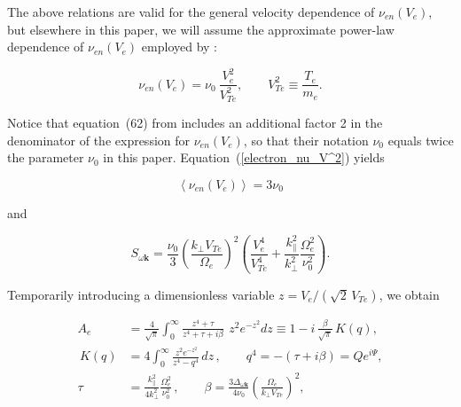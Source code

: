 \documentclass[draft]{agujournal2019}
\renewcommand{\vec}{\mathbf}
\begin{document}
The above relations are valid for the general velocity dependence of $\nu_{en}(V_{e})$, but elsewhere in this 
paper, we will assume the approximate power-law dependence of
$\nu_{en}(V_{e})$ employed by :
\begin{linenomath*}
\begin{equation}
\nu_{en}(V_{e})=\nu_{0}\ \frac{V_{e}^{2}}{V_{Te}^{2}},\qquad V_{Te}^{2}
\equiv\frac{T_{e}}{m_{e}}. 
\label{electron_nu_V^2}
\end{equation}
\end{linenomath*}
Notice that equation~(62) from  includes an additional factor 2 in 
the denominator of the expression for $\nu_{en}(V_{e})$, so that their notation $\nu_{0}$ equals twice the parameter
$\nu_{0}$ in this paper.
%
Equation~(\ref{electron_nu_V^2}) yields
\begin{linenomath*}
\begin{equation}
\left\langle \nu_{en}(V_{e})  \right\rangle =3\nu
_{0}
\label{<nu_en>}
\end{equation}
\end{linenomath*}
and
\begin{linenomath*}
\begin{equation}
S_{\omega\vec{k}}=\frac{\nu_{0}}{3}\left(  \frac{k_{\perp}V_{Te}}%
{\Omega_{e}}\right)  ^{2}\left(\frac{V_{e}^{4}}{V_{Te}^{4}} 
+ \frac{k_{\|}^{2}}{k_{\perp}^{2}}\frac{\Omega_{e}^{2}}{\nu_{0}^{2}}\right)  . 
\label{S_omega,k}
\end{equation}
\end{linenomath*}
Temporarily introducing a dimensionless variable $z=V_e/(\sqrt{2}\,V_{Te})$, we obtain
\begin{linenomath*}
\begin{subequations}\label{A_3,K,tau,beta}
\begin{align}
A_{e}  &  =\frac{4}{\sqrt{\pi}}\int_{0}^{\infty}\frac{z^{4}+\tau}
{z^{4}+\tau+i\beta}\,\ z^{2}e^{-z^{2}}dz\equiv1-i\,\frac{\beta}{\sqrt{\pi}
}\,K(q),
\label{A3}\\
\,K(q)  &  =4\int_{0}^{\infty}\frac{\,z^{2}e^{-z^{2}}}{z^{4}-q^{4}
}\,dz\,,\qquad q^{4}=-(\tau+i\beta)  =Qe^{i\Psi},
\label{Qpsi}\\
\tau &  =\frac{k_{\|}^{2}}{4k_{\perp}^{2}}\frac{\Omega_{e}^{2}}{\nu
_{0}^{2}}\,,\qquad\beta=\frac{3\Delta_{\omega\vec{k}}}{4\nu_{0}}\left(
\frac{\Omega_{e}}{k_{\perp}V_{Te}}\right)  ^{2},
\label{Tau,beta}
\end{align}
\end{subequations}
\end{linenomath*}
\end{document}
